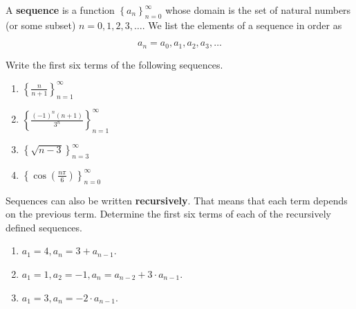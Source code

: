 \documentclass[12 pt]{article}
\begin{document}
A {\bf sequence} is a function $ \left\{ a_{n} \right\}_{n=0}^{\infty}$ whose domain is the set of natural numbers (or some subset) $n=0,1,2,3,\ldots$. We list the elements of a sequence in order as

\[
a_{n}=a_{0},a_{1}, a_{2},a_{3},\ldots
\]
 
Write the first six terms of the following sequences.

\begin{enumerate}

\item ${\displaystyle \left\{ \frac{n}{n+1} \right\}_{n=1}^{\infty}}$

\vspace{40mm}

\item ${\displaystyle \left\{ \frac{ (-1)^n (n+1)}{3^{n}} \right\}_{n=1}^{\infty}}$

\vspace{40mm}

\item $ \left\{ \sqrt{n-3} \right\}_{n=3}^{\infty}$

\vspace{40mm}

\item $ \left\{ \cos \left( \frac{n\pi}{6} \right) \right\}_{n=0}^{\infty}$

\vspace{40mm}

\end{enumerate}

\newpage

Sequences can also be written {\bf recursively}. That means that each term depends on the previous term. Determine the first six terms of each of the recursively defined sequences. 

\begin{enumerate}

\item $a_{1}=4, a_{n}=3+a_{n-1}$. 

\vspace{30mm}

\item $a_{1}=1, a_{2}=-1, a_{n}=a_{n-2}+3\cdot a_{n-1}$.

\vspace{30mm}

\item $a_{1}=3, a_{n}=-2 \cdot a_{n-1}$. 

\vspace{30mm}

\end{enumerate}
\end{document}
